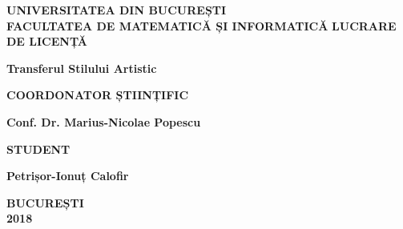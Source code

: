 \begin{titlepage}
	\begin{center}
		\vspace*{1cm}
		\normalsize
		\textbf{UNIVERSITATEA DIN BUCUREȘTI\\
				FACULTATEA DE MATEMATICĂ ȘI INFORMATICĂ}
		\vfill
		\huge
		\textbf{LUCRARE DE LICENȚĂ}

		\large
		\textbf{Transferul Stilului Artistic}
		\vfill
		\normalsize
		\begin{flushleft}
			\textbf{COORDONATOR ȘTIINȚIFIC}

			\textbf{Conf. Dr. Marius-Nicolae Popescu}
		\end{flushleft}

		\begin{flushright}
			\textbf{STUDENT}

			\textbf{Petrișor-Ionuț Calofir}
		\end{flushright}
		\vfill
		\normalsize
		\textbf{BUCUREȘTI\\
				2018}
	\end{center}
\end{titlepage}